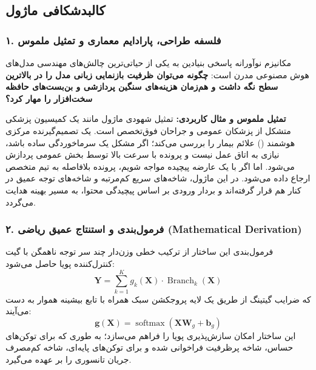 \subsection{کالبدشکافی ماژول }

\subsubsection*{۱. فلسفه طراحی، پارادایم معماری و تمثیل ملموس}
مکانیزم نوآورانه  پاسخی بنیادین به یکی از حیاتی‌ترین چالش‌های مهندسی مدل‌های هوش مصنوعی مدرن است: \textbf{چگونه می‌توان ظرفیت بازنمایی زبانی مدل را در بالاترین سطح نگه داشت و هم‌زمان هزینه‌های سنگین پردازشی و بن‌بست‌های حافظه سخت‌افزار را مهار کرد؟}

\textbf{تمثیل ملموس و مثال کاربردی:}
تمثیل شهودی ماژول  مانند یک کمیسیون پزشکی متشکل از پزشکان عمومی و جراحان فوق‌تخصص است. یک تصمیم‌گیرنده مرکزی هوشمند () علائم بیمار را بررسی می‌کند؛ اگر مشکل یک سرماخوردگی ساده باشد، نیازی به اتاق عمل نیست و پرونده با سرعت بالا توسط بخش عمومی پردازش می‌شود. اما اگر با یک عارضه پیچیده مواجه شویم، پرونده بلافاصله به تیم متخصص ارجاع داده می‌شود. در این ماژول، شاخه‌های سریع کم‌مرتبه و شاخه‌های توجه عمیق در کنار هم قرار گرفته‌اند و بردار ورودی بر اساس پیچیدگی محتوا، به مسیر بهینه هدایت می‌گردد.

\subsubsection*{۲. فرمول‌بندی و استنتاج عمیق ریاضی (Mathematical Derivation)}
فرمول‌بندی این ساختار از ترکیب خطی وزن‌دار چند سر توجه ناهمگن با گیت کنترل‌کننده پویا حاصل می‌شود:
\begin{equation}
\mathbf{Y} = \sum_{k=1}^K g_k(\mathbf{X}) \cdot \operatorname{Branch}_k(\mathbf{X})
\end{equation}
که ضرایب گیتینگ از طریق یک لایه پروجکشن سبک همراه با تابع بیشینه هموار به دست می‌آیند:
\begin{equation}
\mathbf{g}(\mathbf{X}) = \operatorname{softmax}\left( \mathbf{X} \mathbf{W}_g + \mathbf{b}_g \right)
\end{equation}
این ساختار امکان سازش‌پذیری پویا را فراهم می‌سازد؛ به طوری که برای توکن‌های حساس، شاخه پرظرفیت فراخوانی شده و برای توکن‌های پایه‌ای، شاخه کم‌مصرف جریان تانسوری را بر عهده می‌گیرد.

